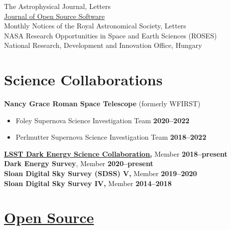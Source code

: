\documentclass[margin]{res}
\begin{document}
\begin{resume}
The Astrophysical Journal, Letters \\ %
\href{https://github.com/openjournals/joss-reviews/issues?utf8=✓&q=is\%3Aissue+benjaminrose+label\%3Areview}{Journal of Open Source Software} \\ 
Monthly Notices of the Royal Astronomical Society, Letters
\\ %
NASA Research Opportunities in Space and Earth Sciences (ROSES) \\
National Research, Development and Innovation Office, Hungary





\section{Science Collaborations}
{\bf Nancy Grace Roman Space Telescope} (formerly WFIRST)
\begin{itemize}\itemsep -2pt
 \item[] Foley Supernova Science Investigation Team \hfill {\bf 2020--2022}
 \item[] Perlmutter Supernova Science Investigation Team \hfill {\bf 2018--2022}
\end{itemize} \vspace{-12pt}
{\bf \href{http://www.lsst-desc.org}{LSST Dark Energy Science Collaboration,}} Member \hfill {\bf 2018--present}
\\
{\bf Dark Energy Survey}, Member \hfill {\bf 2020--present}\\
{\bf Sloan Digital Sky Survey (SDSS) V,} Member \hfill {\bf 2019--2020}\\
{\bf Sloan Digital Sky Survey IV,} Member \hfill {\bf 2014--2018}





\section{\href{https://github.com/benjaminrose}{Open Source}}


\end{resume}
\end{document}
